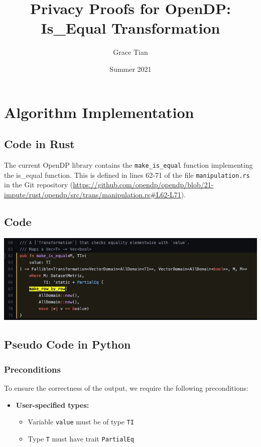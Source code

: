 \documentclass[11pt,a4paper]{article}
\title{Privacy Proofs for OpenDP: Is\_Equal Transformation}
\author{Grace Tian}
\date{Summer 2021}
\begin{document}
\maketitle
\tableofcontents

\section{Algorithm Implementation}
\subsection{Code in Rust}
The current OpenDP library contains the \texttt{make\_is\_equal} function implementing the is\_equal function. This is defined in lines 62-71 of the file \texttt{manipulation.rs} in the Git repository (\url{https://github.com/opendp/opendp/blob/21-impute/rust/opendp/src/trans/manipulation.rs#L62-L71}).

\subsection{Code}


\includegraphics[width=\textwidth]{make_is_equal_new.jpg}


\subsection{Pseudo Code in Python}\label{sec:pseudocode}

\subsubsection*{Preconditions}
To ensure the correctness of the output, we require the following preconditions:

\begin{itemize}
    \item \textbf{User-specified types:}
    \begin{itemize}
        \item Variable \texttt{\texttt{value}} must be of type \texttt{TI}
        \item Type \texttt{T} must have trait \texttt{PartialEq}
    \end{itemize}
\end{itemize}
\end{document}
